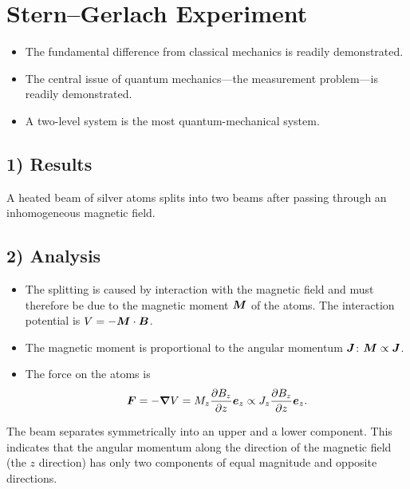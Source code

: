 \section{Stern--Gerlach Experiment}
\begin{itemize}
\item The fundamental difference from classical mechanics is readily demonstrated.
\item The central issue of quantum mechanics---the measurement problem---is readily demonstrated.
\item A two-level system is the most quantum-mechanical system.
\end{itemize}
\begin{center}
\end{center}
\subsection*{1) Results}
A heated beam of silver atoms splits into two beams after passing through an inhomogeneous magnetic field.
\subsection*{2) Analysis}
\begin{itemize}
\item The splitting is caused by interaction with the magnetic field and must therefore be due to the magnetic moment $\bm{M}$ of the atoms. The interaction potential is $V=-\bm{M}\cdot\bm{B}$.
\item The magnetic moment is proportional to the angular momentum $\bm{J}$: $\bm{M}\propto\bm{J}$.
\item The force on the atoms is
\begin{equation}
\bm{F}=-\bm{\nabla} V=M_z\frac{\partial B_z}{\partial z}\bm{e}_z\propto J_z\frac{\partial B_z}{\partial z}\bm{e}_z.
\end{equation}
\end{itemize}
The beam separates symmetrically into an upper and a lower component. This indicates that the angular momentum along the direction of the magnetic field (the $z$ direction) has only two components of equal magnitude and opposite directions.

